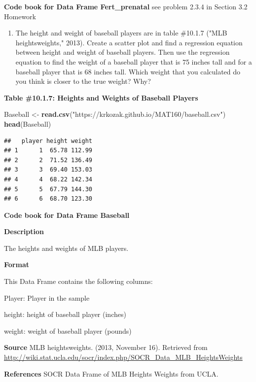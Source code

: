 \documentclass[
]{book}
\newenvironment{Shaded}{\begin{snugshade}}{\end{snugshade}}
\newcommand{\KeywordTok}[1]{\textcolor[rgb]{0.13,0.29,0.53}{\textbf{#1}}}
\newcommand{\NormalTok}[1]{#1}
\newcommand{\StringTok}[1]{\textcolor[rgb]{0.31,0.60,0.02}{#1}}
\providecommand{\tightlist}{%
  \setlength{\itemsep}{0pt}\setlength{\parskip}{0pt}}
\begin{document}
\textbf{Code book for Data Frame Fert\_prenatal} see problem 2.3.4 in Section 3.2 Homework

\begin{enumerate}
\def\labelenumi{\arabic{enumi}.}
\setcounter{enumi}{4}
\tightlist
\item
  The height and weight of baseball players are in table \#10.1.7 ("MLB heightsweights," 2013). Create a scatter plot and find a regression equation between height and weight of baseball players. Then use the regression equation to find the weight of a baseball player that is 75 inches tall and for a baseball player that is 68 inches tall. Which weight that you calculated do you think is closer to the true weight? Why?
\end{enumerate}

\textbf{Table \#10.1.7: Heights and Weights of Baseball Players}

\begin{Shaded}
\begin{Highlighting}[]
\NormalTok{Baseball <-}\StringTok{ }\KeywordTok{read.csv}\NormalTok{(}\StringTok{"https://krkozak.github.io/MAT160/baseball.csv"}\NormalTok{)}
\KeywordTok{head}\NormalTok{(Baseball)}
\end{Highlighting}
\end{Shaded}

\begin{verbatim}
##   player height weight
## 1      1  65.78 112.99
## 2      2  71.52 136.49
## 3      3  69.40 153.03
## 4      4  68.22 142.34
## 5      5  67.79 144.30
## 6      6  68.70 123.30
\end{verbatim}

\textbf{Code book for Data Frame Baseball}

\textbf{Description}

The heights and weights of MLB players.

\textbf{Format}

This Data Frame contains the following columns:

Player: Player in the sample

height: height of baseball player (inches)

weight: weight of baseball player (pounds)

\textbf{Source}
MLB heightsweights. (2013, November 16). Retrieved from
\url{http://wiki.stat.ucla.edu/socr/index.php/SOCR_Data_MLB_HeightsWeights}

\textbf{References}
SOCR Data Frame of MLB Heights Weights from UCLA.
\end{document}
